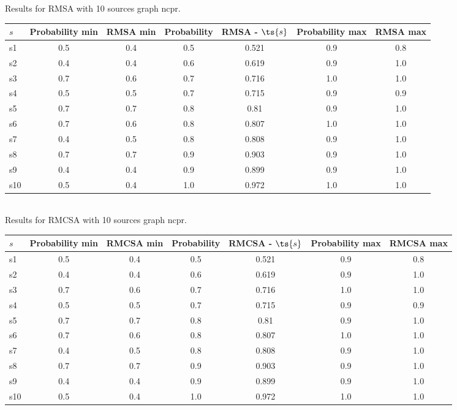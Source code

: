 \documentclass{article}
\begin{document}
\noindent Results for RMSA with 10 sources graph ncpr.

\noindent\begin{tabular}{|l|c|c|c|c|c|c|}
\hline
$s$& Probability min & RMSA min & Probability & RMSA - $\ts{s}$ & Probability max & RMSA max\\
\hline
s1 &0.5 & 0.4 & 0.5 & 0.521 & 0.9 & 0.8\\
\hline
s2 &0.4 & 0.4 & 0.6 & 0.619 & 0.9 & 1.0\\
\hline
s3 &0.7 & 0.6 & 0.7 & 0.716 & 1.0 & 1.0\\
\hline
s4 &0.5 & 0.5 & 0.7 & 0.715 & 0.9 & 0.9\\
\hline
s5 &0.7 & 0.7 & 0.8 & 0.81 & 0.9 & 1.0\\
\hline
s6 &0.7 & 0.6 & 0.8 & 0.807 & 1.0 & 1.0\\
\hline
s7 &0.4 & 0.5 & 0.8 & 0.808 & 0.9 & 1.0\\
\hline
s8 &0.7 & 0.7 & 0.9 & 0.903 & 0.9 & 1.0\\
\hline
s9 &0.4 & 0.4 & 0.9 & 0.899 & 0.9 & 1.0\\
\hline
s10 &0.5 & 0.4 & 1.0 & 0.972 & 1.0 & 1.0\\
\hline
\end{tabular}\\

\noindent Results for RMCSA with 10 sources graph ncpr.

\noindent\begin{tabular}{|l|c|c|c|c|c|c|}
\hline
$s$& Probability min & RMCSA min & Probability & RMCSA - $\ts{s}$ & Probability max & RMCSA max\\
\hline
s1 &0.5 & 0.4 & 0.5 & 0.521 & 0.9 & 0.8\\
\hline
s2 &0.4 & 0.4 & 0.6 & 0.619 & 0.9 & 1.0\\
\hline
s3 &0.7 & 0.6 & 0.7 & 0.716 & 1.0 & 1.0\\
\hline
s4 &0.5 & 0.5 & 0.7 & 0.715 & 0.9 & 0.9\\
\hline
s5 &0.7 & 0.7 & 0.8 & 0.81 & 0.9 & 1.0\\
\hline
s6 &0.7 & 0.6 & 0.8 & 0.807 & 1.0 & 1.0\\
\hline
s7 &0.4 & 0.5 & 0.8 & 0.808 & 0.9 & 1.0\\
\hline
s8 &0.7 & 0.7 & 0.9 & 0.903 & 0.9 & 1.0\\
\hline
s9 &0.4 & 0.4 & 0.9 & 0.899 & 0.9 & 1.0\\
\hline
s10 &0.5 & 0.4 & 1.0 & 0.972 & 1.0 & 1.0\\
\hline
\end{tabular}\\
\end{document}
